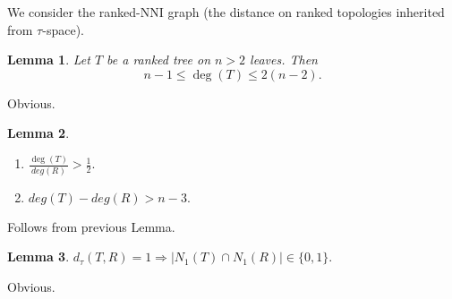 \documentclass[12pt]{article}
\newtheorem{lemma}{Lemma}
\begin{document}
We consider the ranked-NNI graph (the distance on ranked topologies inherited from $\tau$-space). 

\begin{lemma}
Let $T$ be a ranked tree on $n>2$ leaves. Then $$n-1\leq \deg(T)\leq2(n-2).$$ 
\end{lemma}

\proof
Obvious. 
\endproof

\begin{lemma}
\begin{enumerate}[(1)]
\item $\frac{\deg(T)}{deg(R)}>\frac12.$
\item $deg(T)-deg(R)> n-3.$
\end{enumerate}
\end{lemma}

\proof
Follows from previous Lemma. 
\endproof

\begin{lemma}
$d_{\tau}(T,R) = 1 \Rightarrow |N_1(T)\cap N_1(R)|\in\{0,1\}.$
\end{lemma}

\proof
Obvious.
\endproof
\end{document}
